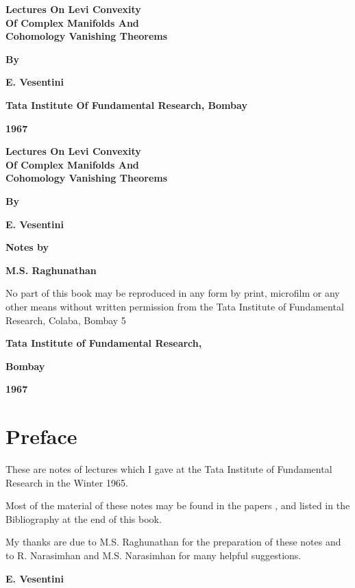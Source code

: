 \thispagestyle{empty}
\begin{center}
{\Large\bf Lectures On Levi Convexity}\\[5pt]
{\Large\bf Of Complex Manifolds And}\\[5pt]
{\Large\bf Cohomology Vanishing Theorems}
\vskip 1cm


{\bf By}\\
\medskip

{\large\bf E. Vesentini}

\vfill


{\bf Tata Institute Of Fundamental Research, Bombay}

{\bf 1967}

\end{center}

\eject

\thispagestyle{empty}
\begin{center}
{\Large\bf Lectures On Levi Convexity}\\[5pt]
{\Large\bf Of Complex Manifolds And}\\[5pt]
{\Large\bf Cohomology Vanishing Theorems}
\vskip 1cm


{\bf By}
\medskip

{\large\bf E. Vesentini}

\vfill

{\bf Notes by}
\medskip

{\large\bf M.S. Raghunathan}
\vfill

\parbox{0.7\textwidth}{No part of this book may be reproduced
in any form by print, microfilm or any
other means without written permission
from the Tata Institute of Fundamental
Research, Colaba, Bombay 5}
\vfill

{\bf Tata Institute of Fundamental Research,}

{\bf Bombay}

{\bf 1967}
\end{center}

\eject

\chapter{Preface}

These are notes of lectures which I gave at the Tata Institute of
Fundamental Research in the Winter 1965.



Most of the material of these notes may be found in the papers
\cite{key1}, \cite{key2} and \cite{key16} listed in the Bibliography
at the end of this book.



My thanks are due to M.S. Raghunathan for the preparation of these
notes and to R. Narasimhan and M.S. Narasimhan for many helpful
suggestions.

\bigskip

\hfill{\large\bf E. Vesentini}

